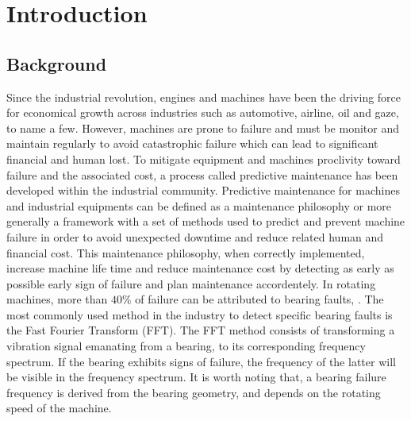\documentclass[../Main/thesis.tex]{subfiles}
\begin{document}
\chapter{Introduction}
\label{ch:introduction}

\section{Background}
\label{sec:background}
Since the industrial revolution, engines and machines have been the driving force for economical growth across industries such as automotive, airline, oil and gaze, to name a few. However, machines are prone to failure and must be monitor and maintain regularly to avoid catastrophic failure which can lead to significant financial and human lost. To mitigate equipment and machines proclivity toward failure and the associated cost, a process called predictive maintenance has been developed within the industrial community. Predictive maintenance  for machines and industrial equipments can be defined as a maintenance philosophy or more generally a framework with a set of methods used to predict and prevent machine failure in order to avoid unexpected downtime and reduce related human and financial cost. This maintenance philosophy, when correctly implemented, increase machine life time and reduce maintenance cost by detecting as early as possible early sign of failure and plan maintenance accordentely.
\justify
In rotating machines, more than $40 \% $ of failure can be attributed to bearing faults, \cite{patidar13}. The most commonly used method in the industry to detect specific bearing faults is the Fast Fourier Transform (FFT). The FFT method consists of transforming a vibration signal emanating from a bearing, to its corresponding frequency spectrum. If the bearing exhibits signs of failure, the frequency of the latter will be visible in the frequency spectrum. It is worth noting that, a bearing failure frequency is derived from the bearing geometry, and depends on the rotating speed of the machine.
\end{document}
